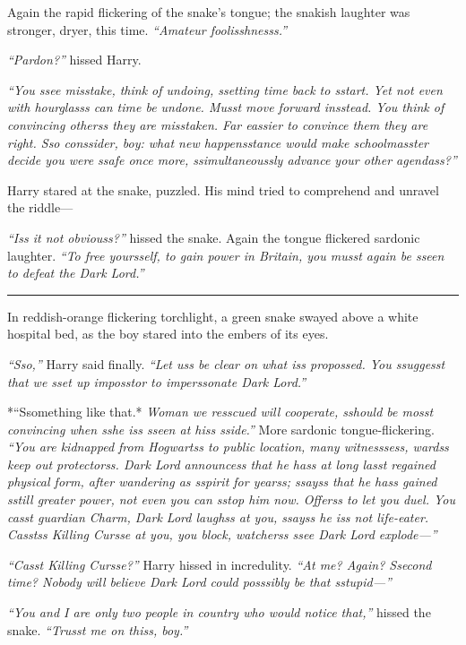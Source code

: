 Again the rapid flickering of the snake's tongue; the snakish laughter
was stronger, dryer, this time. \emph{``Amateur foolisshnesss.''}

\emph{``Pardon?''} hissed Harry.

\emph{``You ssee misstake, think of undoing, ssetting time back to
sstart. Yet not even with hourglasss can time be undone. Musst move
forward insstead. You think of convincing otherss they are misstaken.
Far eassier to convince them they are right. Sso conssider, boy: what
new happensstance would make schoolmasster decide you were ssafe once
more, ssimultaneoussly advance your other agendass?''}

Harry stared at the snake, puzzled. His mind tried to comprehend and
unravel the riddle---

\emph{``Iss it not obviouss?''} hissed the snake. Again the tongue
flickered sardonic laughter. \emph{``To free yoursself, to gain power in
Britain, you musst again be sseen to defeat the Dark Lord.''}

\begin{center}\rule{3in}{0.4pt}\end{center}

In reddish-orange flickering torchlight, a green snake swayed above a
white hospital bed, as the boy stared into the embers of its eyes.

\emph{``Sso,''} Harry said finally. \emph{``Let uss be clear on what iss
propossed. You ssuggesst that we sset up imposstor to imperssonate Dark
Lord.''}

*``Ssomething like that.* \emph{Woman we resscued will cooperate,
sshould be mosst convincing when sshe iss sseen at hiss sside.''} More
sardonic tongue-flickering. \emph{``You are kidnapped from Hogwartss to
public location, many witnesssess, wardss keep out protectorss. Dark
Lord announcess that he hass at long lasst regained physical form, after
wandering as sspirit for yearss; ssayss that he hass gained sstill
greater power, not even you can sstop him now. Offerss to let you duel.
You casst guardian Charm, Dark Lord laughss at you, ssayss he iss not
life-eater. Casstss Killing Cursse at you, you block, watcherss ssee
Dark Lord explode---''}

\emph{``Casst Killing Cursse?''} Harry hissed in incredulity. \emph{``At
me? Again? Ssecond time? Nobody will believe Dark Lord could posssibly
be that sstupid---''}

\emph{``You and I are only two people in country who would notice
that,''} hissed the snake. \emph{``Trusst me on thiss, boy.''}

